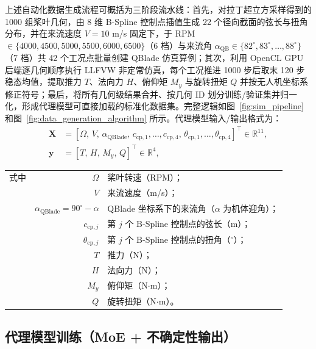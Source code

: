 上述自动化数据生成流程可概括为三阶段流水线：首先，对拉丁超立方采样得到的 1000 组桨叶几何，由 8 维 B-Spline 控制点插值生成 22 个径向截面的弦长与扭角分布，并在来流速度 $V=10$ m/s 固定下，于 RPM $\in\{4000,4500,5000,5500,6000,6500\}$（6 档）与来流角 $\alpha_\text{QB}\in\{82^\circ,83^\circ,\dots,88^\circ\}$（7 档）共 42 个工况点批量创建 QBlade 仿真算例；其次，利用 OpenCL GPU 后端逐几何顺序执行 LLFVW 非定常仿真，每个工况推进 1000 步后取末 120 步稳态均值，提取推力 $T$、法向力 $H$、俯仰矩 $M_y$ 与旋转扭矩 $Q$ 并按无人机坐标系修正符号；最后，将所有几何级结果合并、按几何 ID 划分训练/验证集并归一化，形成代理模型可直接加载的标准化数据集。完整逻辑如图~\ref{fig:sim_pipeline} 和图~\ref{fig:data_generation_algorithm} 所示。代理模型输入/输出格式为：
\begin{equation}
\begin{aligned}
\mathbf{X} &=
[\Omega,\, V,\, \alpha_{\mathrm{QBlade}},\, c_{\mathrm{cp},1},\dots,c_{\mathrm{cp},4},\,
\theta_{\mathrm{cp},1},\dots,\theta_{\mathrm{cp},4}]^{\top} \in \mathbb{R}^{11},\\
\mathbf{y} &= [T,\, H,\, M_y,\, Q]^{\top} \in \mathbb{R}^{4},
\end{aligned}
\end{equation}
\begin{tabularx}{\textwidth}{@{}l@{\quad}r@{———}X@{}}
式中 & $\Omega$                          & 桨叶转速（RPM）；\\
     & $V$                               & 来流速度（m/s）；\\
     & $\alpha_{\mathrm{QBlade}} = 90^\circ - \alpha$ & QBlade 坐标系下的来流角（$\alpha$ 为机体迎角）；\\
     & $c_{\mathrm{cp},j}$              & 第 $j$ 个 B-Spline 控制点的弦长（m）；\\
     & $\theta_{\mathrm{cp},j}$         & 第 $j$ 个 B-Spline 控制点的扭角（$^\circ$）；\\
     & $T$                               & 推力（N）；\\
     & $H$                               & 法向力（N）；\\
     & $M_y$                             & 俯仰矩（N$\cdot$m）；\\
     & $Q$                               & 旋转扭矩（N$\cdot$m）。\\
\end{tabularx}\vspace{3.15bp}

\subsection{代理模型训练（MoE + 不确定性输出）}

